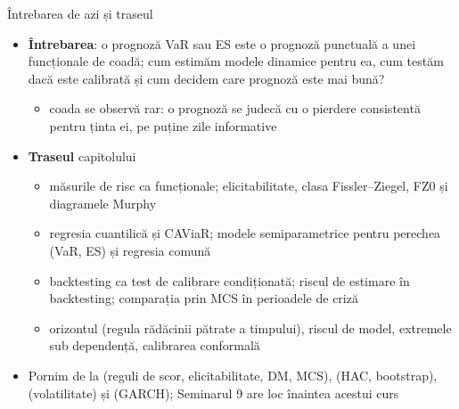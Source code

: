 \begin{frame}{Întrebarea de azi și traseul}
\itemsize{\small}
\begin{itemize}
    \item \textbf{Întrebarea}: o prognoză VaR sau ES este o prognoză punctuală a unei funcționale de coadă; cum estimăm modele dinamice pentru ea, cum testăm dacă este calibrată și cum decidem care prognoză este mai bună?
    \begin{itemize}
        \item coada se observă rar: o prognoză se judecă cu o pierdere consistentă pentru ținta ei, pe puține zile informative
    \end{itemize}
    \item \textbf{Traseul} capitolului
    \begin{itemize}
        \item măsurile de risc ca funcționale; elicitabilitate, clasa Fissler--Ziegel, FZ0 și diagramele Murphy
        \item regresia cuantilică și CAViaR; modele semiparametrice pentru perechea (VaR, ES) și regresia comună
        \item backtesting ca test de calibrare condiționată; riscul de estimare în backtesting; comparația prin MCS în perioadele de criză
        \item orizontul (regula rădăcinii pătrate a timpului), riscul de model, extremele sub dependență, calibrarea conformală
    \end{itemize}
    \item Pornim de la  (reguli de scor, elicitabilitate, DM, MCS),  (HAC, bootstrap),  (volatilitate) și  (GARCH); Seminarul 9 are loc înaintea acestui curs
\end{itemize}
\end{frame}


